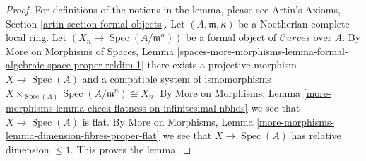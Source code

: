 \documentclass{stacks-project}
\theoremstyle{plain}
\theoremstyle{definition}
\theoremstyle{remark}
\numberwithin{equation}{subsection}
\def\Spec{\mathop{\mathrm{Spec}}}
\def\Curvesstack{\mathcal{C}\!\mathit{urves}}
\begin{document}
\begin{proof}
For definitions of the notions in the lemma, please see
Artin's Axioms, Section \ref{artin-section-formal-objects}.
Let $(A, \mathfrak m, \kappa)$ be a Noetherian complete
local ring. Let $(X_n \to \Spec(A/\mathfrak m^n))$
be a formal object of $\Curvesstack$ over $A$.
By More on Morphisms of Spaces, Lemma
\ref{spaces-more-morphisms-lemma-formal-algebraic-space-proper-reldim-1}
there exists a projective morphism $X \to \Spec(A)$
and a compatible system of ismomorphisms
$X \times_{\Spec(A)} \Spec(A/\mathfrak m^n) \cong X_n$. By
More on Morphisms, Lemma
\ref{more-morphisms-lemma-check-flatness-on-infinitesimal-nbhds}
we see that $X \to \Spec(A)$ is flat. By More on Morphisms, Lemma
\ref{more-morphisms-lemma-dimension-fibres-proper-flat}
we see that $X \to \Spec(A)$ has relative dimension $\leq 1$.
This proves the lemma.
\end{proof}
\end{document}
